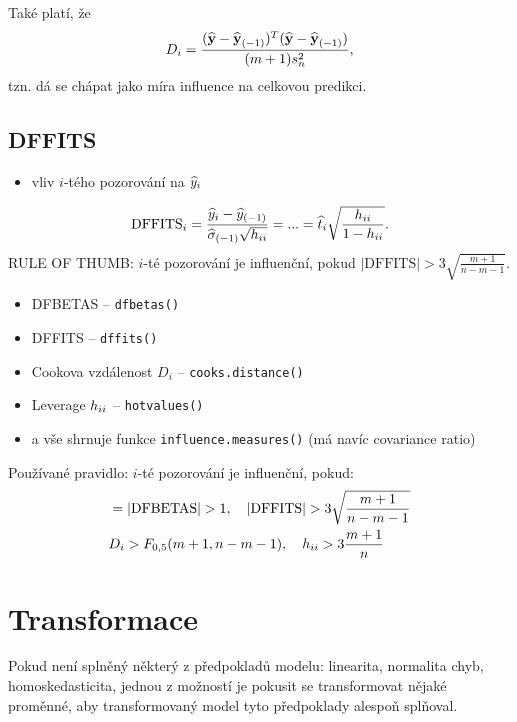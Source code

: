 \begin{remark}
	Také platí, že 
	$$ D_i=\frac{(\widehat{\textbf{y}}-{\widehat{\textbf{y}}_{(-1)}})^T(\widehat{\textbf{y}}-{\widehat{\textbf{y}}_{(-1)}})}{(m+1)s_n^2},$$
	tzn. dá se chápat jako míra influence na celkovou predikci.
\end{remark}

\subsection*{DFFITS}
\begin{itemize}
	\item vliv $i$-tého pozorování na $\widehat{y}_i$
\end{itemize}
$$ \mathrm{DFFITS}_i=\frac{\widehat{y}_i-{\widehat{y}_{(-1)}}}{{\widehat{{\sigma}}_{(-1)}}\sqrt{h_{ii}}}=...=\widehat{t}_i\sqrt{\frac{h_{ii}}{1-h_{ii}}}.$$
RULE OF THUMB: $i$-té pozorování je influenční, pokud $|\mathrm{DFFITS}|>3\sqrt{\frac{m+1}{n-m-1}}$.

\begin{remark}
\begin{itemize}
	\item DFBETAS -- \verb|dfbetas()|
	\item DFFITS -- \verb|dffits()|
	\item Cookova vzdálenost $D_i$ -- \verb|cooks.distance()|
	\item Leverage $h_{ii}$ -- \verb|hotvalues()|
	\item a vše shrnuje funkce \verb|influence.measures()| (má navíc covariance ratio)
\end{itemize}

Používané pravidlo: $i$-té pozorování je influenční, pokud:
\begin{align*}
	& = | \mathrm{DFBETAS} | > 1, \quad |\mathrm{DFFITS}| > 3 \sqrt{\frac{m+1}{n-m-1}} \\
	& D_i > F_{0,5}(m+1,n-m-1), \quad h_{ii} > 3 \frac{m+1}{n}
\end{align*}
\end{remark}

\section{Transformace}

Pokud není splněný některý z předpokladů modelu: linearita, normalita chyb, homoskedasticita, jednou z možností je pokusit se transformovat nějaké proměnné, aby transformovaný model tyto předpoklady alespoň  splňoval.

